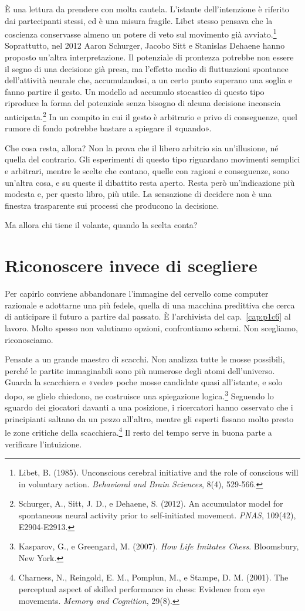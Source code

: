 È una lettura da prendere con molta cautela. L'istante dell'intenzione è riferito dai partecipanti stessi, ed è una misura fragile. Libet stesso pensava che la coscienza conservasse almeno un potere di veto sul movimento già avviato.\footnote{Libet, B. (1985). Unconscious cerebral initiative and the role of conscious will in voluntary action. \textit{Behavioral and Brain Sciences}, 8(4), 529-566.} Soprattutto, nel 2012 Aaron Schurger, Jacobo Sitt e Stanislas Dehaene hanno proposto un'altra interpretazione. Il potenziale di prontezza potrebbe non essere il segno di una decisione già presa, ma l'effetto medio di fluttuazioni spontanee dell'attività neurale che, accumulandosi, a un certo punto superano una soglia e fanno partire il gesto. Un modello ad accumulo stocastico di questo tipo riproduce la forma del potenziale senza bisogno di alcuna decisione inconscia anticipata.\footnote{Schurger, A., Sitt, J. D., e Dehaene, S. (2012). An accumulator model for spontaneous neural activity prior to self-initiated movement. \textit{PNAS}, 109(42), E2904-E2913.} In un compito in cui il gesto è arbitrario e privo di conseguenze, quel rumore di fondo potrebbe bastare a spiegare il «quando».

Che cosa resta, allora? Non la prova che il libero arbitrio sia un'illusione, né quella del contrario. Gli esperimenti di questo tipo riguardano movimenti semplici e arbitrari, mentre le scelte che contano, quelle con ragioni e conseguenze, sono un'altra cosa, e su queste il dibattito resta aperto. Resta però un'indicazione più modesta e, per questo libro, più utile. La sensazione di decidere non è una finestra trasparente sui processi che producono la decisione.

Ma allora chi tiene il volante, quando la scelta conta?

\section{Riconoscere invece di scegliere}

Per capirlo conviene abbandonare l'immagine del cervello come computer razionale e adottarne una più fedele, quella di una macchina predittiva che cerca di anticipare il futuro a partire dal passato. È l'archivista del cap.~\ref{cap:p1c6} al lavoro. Molto spesso non valutiamo opzioni, confrontiamo schemi. Non scegliamo, riconosciamo.

Pensate a un grande maestro di scacchi. Non analizza tutte le mosse possibili, perché le partite immaginabili sono più numerose degli atomi dell'universo. Guarda la scacchiera e «vede» poche mosse candidate quasi all'istante, e solo dopo, se glielo chiedono, ne costruisce una spiegazione logica.\footnote{Kasparov, G., e Greengard, M. (2007). \textit{How Life Imitates Chess}. Bloomsbury, New York.} Seguendo lo sguardo dei giocatori davanti a una posizione, i ricercatori hanno osservato che i principianti saltano da un pezzo all'altro, mentre gli esperti fissano molto presto le zone critiche della scacchiera.\footnote{Charness, N., Reingold, E. M., Pomplun, M., e Stampe, D. M. (2001). The perceptual aspect of skilled performance in chess: Evidence from eye movements. \textit{Memory and Cognition}, 29(8).} Il resto del tempo serve in buona parte a verificare l'intuizione.

